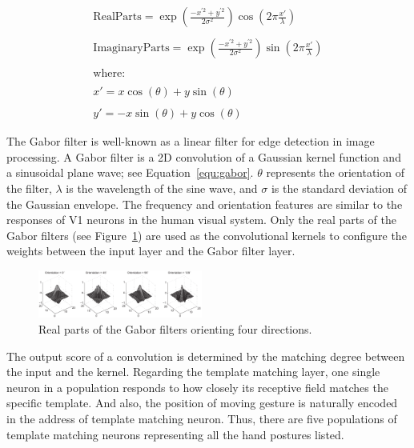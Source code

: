 \documentclass[journal]{journal}
\begin{document}
\begin{equation}
\begin{array}{l}
\mathrm{Real Parts} = \exp \left(\frac{-x^{'2}+y^{'2}}{2\sigma ^{2}}\right)\cos \left(2\pi\frac{{x}'}{\lambda }\right)
\\
\\
\mathrm{Imaginary Parts} = \exp \left(\frac{-x^{'2}+y^{'2}}{2\sigma ^{2}}\right)\sin \left(2\pi\frac{{x}'}{\lambda }\right)
\\
\\
\mathrm{where:}
\\
\\
{x}'=x\cos (\theta ) + y\sin (\theta)
\\
\\
{y}'=-x\sin (\theta ) + y\cos (\theta)
\end{array}
\label{equ:gabor}
\end{equation}

The Gabor filter is well-known as a linear filter for edge detection in image processing. 
A Gabor filter is a 2D convolution of a Gaussian kernel function and a sinusoidal plane wave; see Equation~\ref{equ:gabor}. 
$\theta$ represents the orientation of the filter, $\lambda$ is the wavelength of the sine wave, and $\sigma$ is the standard deviation of the Gaussian envelope. 
The frequency and orientation features are similar to the responses of V1 neurons in the human visual system. 
Only the real parts of the Gabor filters (see Figure~\ref{fig:gabor}) are used as the convolutional kernels to configure the weights between the input layer and the Gabor filter layer.

\begin{figure}
\centering
	\includegraphics[width=0.48\textwidth]{pics/gabor.pdf}
	\caption{Real parts of the Gabor filters orienting four directions.}
	\label{fig:gabor}
\end{figure}

The output score of a convolution is determined by the matching degree between the input and the kernel.
Regarding the template matching layer, one single neuron in a population responds to how closely its receptive field matches the specific template.
And also, the position of moving gesture is naturally encoded in the address of template matching neuron.
Thus, there are five populations of template matching neurons representing all the hand postures listed.
\end{document}
